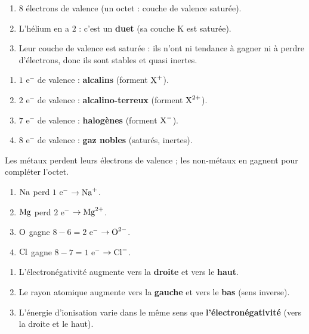 \documentclass[11pt,a4paper]{article}
\begin{document}
\begin{corrige}
\begin{enumerate}[label=\alph*)]
  \item $8$ électrons de valence (un octet : couche de valence saturée).
  \item L'hélium en a $2$ : c'est un \textbf{duet} (sa couche K est saturée).
  \item Leur couche de valence est saturée : ils n'ont ni tendance à gagner ni à perdre d'électrons,
        donc ils sont stables et quasi inertes.
\end{enumerate}
\end{corrige}

\begin{corrige}
\begin{enumerate}[label=\alph*)]
  \item $1$ e$^-$ de valence : \textbf{alcalins} (forment $\ce{X^{+}}$).
  \item $2$ e$^-$ de valence : \textbf{alcalino-terreux} (forment $\ce{X^{2+}}$).
  \item $7$ e$^-$ de valence : \textbf{halogènes} (forment $\ce{X^{-}}$).
  \item $8$ e$^-$ de valence : \textbf{gaz nobles} (saturés, inertes).
\end{enumerate}
\end{corrige}

\begin{corrige}
Les métaux perdent leurs électrons de valence ; les non-métaux en gagnent pour compléter l'octet.
\begin{enumerate}[label=\alph*)]
  \item $\ce{Na}$ perd $1$ e$^-$ $\to \ce{Na^{+}}$.
  \item $\ce{Mg}$ perd $2$ e$^-$ $\to \ce{Mg^{2+}}$.
  \item $\ce{O}$ gagne $8-6 = 2$ e$^-$ $\to \ce{O^{2-}}$.
  \item $\ce{Cl}$ gagne $8-7 = 1$ e$^-$ $\to \ce{Cl^{-}}$.
\end{enumerate}
\end{corrige}

\begin{corrige}
\begin{enumerate}[label=\alph*)]
  \item L'électronégativité augmente vers la \textbf{droite} et vers le \textbf{haut}.
  \item Le rayon atomique augmente vers la \textbf{gauche} et vers le \textbf{bas} (sens inverse).
  \item L'énergie d'ionisation varie dans le même sens que \textbf{l'électronégativité}
        (vers la droite et le haut).
\end{enumerate}
\end{corrige}
\end{document}
